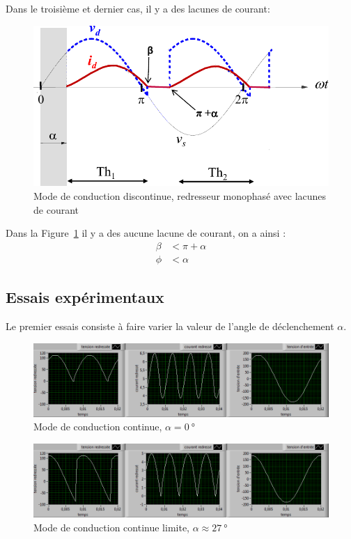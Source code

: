 \documentclass[a4paper, 11pt, openany, oneside, french]{article}
\begin{document}
\clearpage
Dans le troisième et dernier cas, il y a des lacunes de courant:
\begin{figure}[!ht]
    \centering
    \includegraphics[width=0.8\linewidth]{dcm}
    \caption{Mode de conduction discontinue, redresseur monophasé avec lacunes de courant}
    \label{fig:dcm}
\end{figure}

Dans la Figure~\ref{fig:dcm} il y a des aucune lacune de courant, on a ainsi :
\begin{align*}
    \beta &< \pi+\alpha\\
    \phi &< \alpha
\end{align*}

\subsection{Essais expérimentaux}
Le premier essais consiste à faire varier la valeur de l'angle de déclenchement $\alpha$.

\begin{figure}[!ht]
    \centering
    \includegraphics[width=\linewidth]{red_1_3}
    \caption{Mode de conduction continue, $\alpha=\SI{0}{\degree}$}
    \label{fig:ccm_msr}
\end{figure}

\begin{figure}[!ht]
    \centering
    \includegraphics[width=\linewidth]{red_1_2}
    \caption{Mode de conduction continue limite, $\alpha \approx \SI{27}{\degree}$}
    \label{fig:lim_ccm_msr}
\end{figure}
\end{document}
